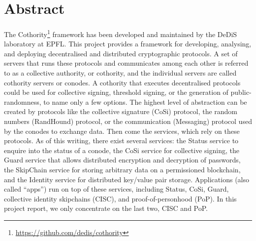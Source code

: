 \section*{Abstract\raisebox{.3\baselineskip}{\normalsize\footnotemark}}

\paragraph{}
The Cothority\footnote{\url{https://github.com/dedis/cothority}} framework has been developed and maintained by the DeDiS laboratory at EPFL. This project provides a framework for developing, analysing, and deploying decentralised and distributed cryptographic protocols. A set of servers that runs these protocols and communicates among each other is referred to as a collective authority, or cothority, and the individual servers are called cothority servers or conodes. A cothority that executes decentralised protocols could be used for collective signing, threshold signing, or the generation of public-randomness, to name only a few options. The highest level of abstraction can be created by protocols like the collective signature (CoSi) protocol, the random numbers (RandHound) protocol, or the communication (Messaging) protocol used by the conodes to exchange data. Then come the services, which rely on these protocols. As of this writing, there exist several services: the Status service to enquire into the status of a conode, the CoSi service for collective signing, the Guard service that allows distributed encryption and decryption of passwords, the SkipChain service for storing arbitrary data on a permissioned blockchain, and the Identity service for distributed key/value pair storage. Applications (also called “apps”) run on top of these services, including Status, CoSi, Guard, collective identity skipchains (CISC), and proof-of-personhood (PoP). In this project report, we only concentrate on the last two, CISC and PoP.


